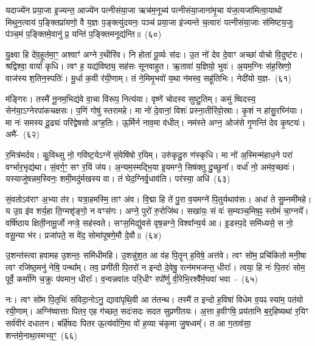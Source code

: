 यदाज्ये॑न प्रया॒जा इ॒ज्यन्त॒ आज्ये॑न पत्नीसंया॒जा ऋच॑म॒नूच्य॑ पत्नीसंया॒जाना॑मृ॒चा य॑ज॒त्यजा॑मित्वा॒याथो॑ मिथुन॒त्वाय॑ प॒ङ्क्तिप्रा॑यणो॒ वै य॒ज्ञः प॒ङ्क्त्यु॑दयनः॒ पञ्च॑ प्रया॒जा इ॑ज्यन्ते च॒त्वारः॑ पत्नीसंया॒जाः स॑मिष्टय॒जुः प॑ञ्च॒मं प॒ङ्क्तिमे॒वानु॑ प्र॒ यन्ति॑ प॒ङ्क्तिमनूद्य॑न्ति॥~(६०)

{\anuvakamend[{प्र॒जायाः᳚ करोति॒ तत्क्रि॑यते॒ त्रय॑स्त्रिꣳशच्च}]}%

यु॒क्ष्वा हि दे॑व॒हूत॑मा॒ꣳ॒ अश्वाꣳ॑ अग्ने र॒थीरि॑व। नि होता॑ पू॒र्व्यः स॑दः। उ॒त नो॑ देव दे॒वाꣳ अच्छा॑ वोचो वि॒दुष्ट॑रः। श्रद्विश्वा॒ वार्या॑ कृधि। त्वꣳ ह॒ यद्य॑विष्ठ्य॒ सह॑सः सूनवाहुत। ऋ॒तावा॑ य॒ज्ञियो॒ भुवः॑। अ॒यम॒ग्निः स॑ह॒स्रिणो॒ वाज॑स्य श॒तिन॒स्पतिः॑। मू॒र्धा क॒वी र॑यी॒णाम्। तं ने॒मिमृ॒भवो॑ य॒था न॑मस्व॒ सहू॑तिभिः। नेदी॑यो य॒ज्ञ-~(६१)

म॑ङ्गिरः। तस्मै॑ नू॒नम॒भिद्य॑वे वा॒चा वि॑रूप॒ नित्य॑या। वृष्णे॑ चोदस्व सुष्टु॒तिम्। कमु॑ ष्विदस्य॒ सेन॑या॒\-ऽग्नेरपा॑कचक्षसः। प॒णिं गोषु॑ स्तरामहे। मा नो॑ दे॒वानां॒ विशः॑ प्रस्ना॒तीरि॑वो॒स्राः। कृ॒शं न हा॑सु॒रघ्नि॑याः। मा नः॑ समस्य दू॒ढ्यः॑ परि॑द्वेषसो अꣳह॒तिः। ऊ॒र्मिर्न नाव॒मा व॑धीत्। नम॑स्ते अग्न॒ ओज॑से गृ॒णन्ति॑ देव कृ॒ष्टयः॑। अमै॑-~(६२)

र॒मित्र॑मर्दय। कु॒विथ्सु नो॒ गवि॑ष्ट॒ये\-ऽग्ने॑ सं॒वेषि॑षो र॒यिम्। उरु॑कृदु॒रु ण॑स्कृधि। मा नो॑ अ॒स्मिन्म॑हाध॒ने परा॑ वर्ग्भार॒भृद्य॑था। सं॒वर्ग॒ꣳ॒ सꣳ र॒यिं ज॑य। अ॒न्यम॒स्मद्भि॒या इ॒यमग्ने॒ सिष॑क्तु दु॒च्छुना᳚। वर्धा॑ नो॒ अम॑व॒च्छवः॑। यस्याजु॑षन्नम॒स्विनः॒ शमी॒मदु॑र्मखस्य वा। तं घेद॒ग्निर्वृ॒धाव॑ति। पर॑स्या॒ अधि॑~(६३)

सं॒वतो\-ऽव॑राꣳ अ॒भ्या त॑र। यत्रा॒हमस्मि॒ ताꣳ अ॑व। वि॒द्मा हि ते॑ पु॒रा व॒यमग्ने॑ पि॒तुर्यथाव॑सः। अधा॑ ते सु॒म्नमी॑महे। य उ॒ग्र इ॑व शर्य॒हा ति॒ग्मशृ॑ङ्गो॒ न वꣳस॑गः। अग्ने॒ पुरो॑ रु॒रोजि॑थ। सखा॑यः॒ सं वः॑ स॒म्यञ्च॒मिष॒ꣴ॒ स्तोमं॑ चा॒ग्नये᳚। वर्\mbox{}षि॑ष्ठाय क्षिती॒नामू॒र्जो नप्त्रे॒ सह॑\-स्वते। सꣳस॒मिद्यु॑वसे वृष॒न्नग्ने॒ विश्वा᳚न्य॒र्य आ। इ॒डस्प॒दे समि॑ध्यसे॒ स नो॒ वसू॒न्या भ॑र। प्रजा॑पते॒ स वे॑द॒ सोमा॑पूषणे॒मौ दे॒वौ॥~(६४)

{\anuvakamend[{य॒ज्ञममै॒रधि॑ वृष॒न्नेका॒न्नविꣳ॑श॒तिश्च॑}]}%

उ॒शन्त॑स्त्वा हवामह उ॒शन्तः॒ समि॑धीमहि। उ॒शन्नु॑श॒त आ व॑ह पि॒तॄन् ह॒विषे॒ अत्त॑वे। त्वꣳ सो॑म॒ प्रचि॑कितो मनी॒षा त्वꣳ रजि॑ष्ठ॒मनु॑ नेषि॒ पन्था᳚म्। तव॒ प्रणी॑ती पि॒तरो॑ न इन्दो दे॒वेषु॒ रत्न॑मभजन्त॒ धीराः᳚। त्वया॒ हि नः॑ पि॒तरः॑ सोम॒ पूर्वे॒ कर्मा॑णि च॒क्रुः प॑वमान॒ धीराः᳚। व॒न्वन्नवा॑तः परि॒धीꣳ रपो᳚र्णु वी॒रेभि॒रश्वै᳚र्म॒घवा॑ भवा~-~(६५)

नः। त्वꣳ सो॑म पि॒तृभिः॑ संविदा॒नो\-ऽनु॒ द्यावा॑पृथि॒वी आ त॑तन्थ। तस्मै॑ त इन्दो ह॒विषा॑ विधेम व॒यꣴ स्या॑म॒ पत॑यो रयी॒णाम्। अग्नि॑ष्वात्ताः पितर॒ एह ग॑च्छत॒ सदः॑सदः सदत सुप्रणीतयः। अ॒त्ता ह॒वीꣳषि॒ प्रय॑तानि ब॒र्॒\mbox{}हिष्यथा॑ र॒यिꣳ सर्व॑वीरं दधातन। बर्\mbox{}हि॑षदः पितर ऊ॒त्य॑र्वागि॒मा वो॑ ह॒व्या च॑कृमा जु॒षध्वम्᳚। त आ ग॒ताव॑सा॒ शन्त॑मे॒नाथा॒स्मभ्य॒ꣳ॒~(६६)

